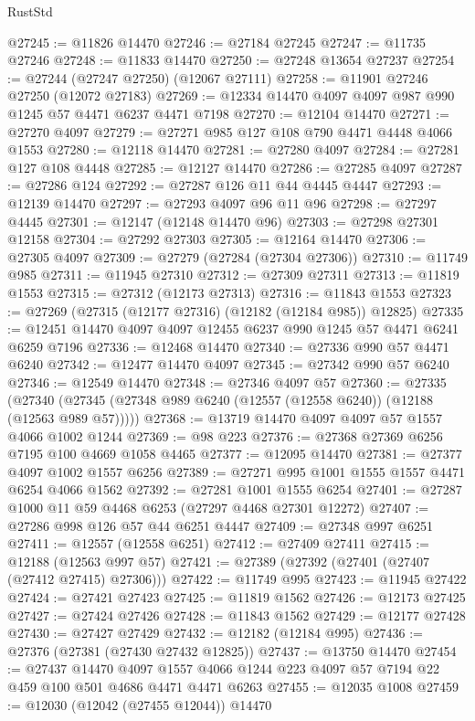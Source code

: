 \begin{lexlean}{RustStd}
\begin{coremodule}
@27245 := @11826 @14470
@27246 := @27184 @27245
@27247 := @11735 @27246
@27248 := @11833 @14470
@27250 := @27248 @13654 @27237
@27254 := @27244 (@27247 @27250) (@12067 @27111)
@27258 := @11901 @27246 @27250 (@12072 @27183)
@27269 := @12334 @14470 @4097 @4097 @987 @990 @1245 @57 @4471 @6237 @4471 @7198
@27270 := @12104 @14470
@27271 := @27270 @4097
@27279 := @27271 @985 @127 @108 @790 @4471 @4448 @4066 @1553
@27280 := @12118 @14470
@27281 := @27280 @4097
@27284 := @27281 @127 @108 @4448
@27285 := @12127 @14470
@27286 := @27285 @4097
@27287 := @27286 @124
@27292 := @27287 @126 @11 @44 @4445 @4447
@27293 := @12139 @14470
@27297 := @27293 @4097 @96 @11 @96
@27298 := @27297 @4445
@27301 := @12147 (@12148 @14470 @96)
@27303 := @27298 @27301 @12158
@27304 := @27292 @27303
@27305 := @12164 @14470
@27306 := @27305 @4097
@27309 := @27279 (@27284 (@27304 @27306))
@27310 := @11749 @985
@27311 := @11945 @27310
@27312 := @27309 @27311
@27313 := @11819 @1553
@27315 := @27312 (@12173 @27313)
@27316 := @11843 @1553
@27323 := @27269 (@27315 (@12177 @27316) (@12182 (@12184 @985)) @12825)
@27335 := @12451 @14470 @4097 @4097 @12455 @6237 @990 @1245 @57 @4471 @6241 @6259 @7196
@27336 := @12468 @14470
@27340 := @27336 @990 @57 @4471 @6240
@27342 := @12477 @14470 @4097
@27345 := @27342 @990 @57 @6240
@27346 := @12549 @14470
@27348 := @27346 @4097 @57
@27360 := @27335
    (@27340 (@27345 (@27348 @989 @6240 (@12557 (@12558 @6240)) (@12188 (@12563 @989 @57)))))
@27368 := @13719 @14470 @4097 @4097 @57 @1557 @4066 @1002 @1244
@27369 := @98 @223
@27376 := @27368 @27369 @6256 @7195 @100 @4669 @1058 @4465
@27377 := @12095 @14470
@27381 := @27377 @4097 @1002 @1557 @6256
@27389 := @27271 @995 @1001 @1555 @1557 @4471 @6254 @4066 @1562
@27392 := @27281 @1001 @1555 @6254
@27401 := @27287 @1000 @11 @59 @4468 @6253 (@27297 @4468 @27301 @12272)
@27407 := @27286 @998 @126 @57 @44 @6251 @4447
@27409 := @27348 @997 @6251
@27411 := @12557 (@12558 @6251)
@27412 := @27409 @27411
@27415 := @12188 (@12563 @997 @57)
@27421 := @27389 (@27392 (@27401 (@27407 (@27412 @27415) @27306)))
@27422 := @11749 @995
@27423 := @11945 @27422
@27424 := @27421 @27423
@27425 := @11819 @1562
@27426 := @12173 @27425
@27427 := @27424 @27426
@27428 := @11843 @1562
@27429 := @12177 @27428
@27430 := @27427 @27429
@27432 := @12182 (@12184 @995)
@27436 := @27376 (@27381 (@27430 @27432 @12825))
@27437 := @13750 @14470
@27454 := @27437
    @14470
    @4097
    @1557
    @4066
    @1244
    @223
    @4097
    @57
    @7194
    @22
    @459
    @100
    @501
    @4686
    @4471
    @4471
    @6263
@27455 := @12035 @1008
@27459 := @12030 (@12042 (@27455 @12044)) @14470

\end{coremodule}
\end{lexlean}
